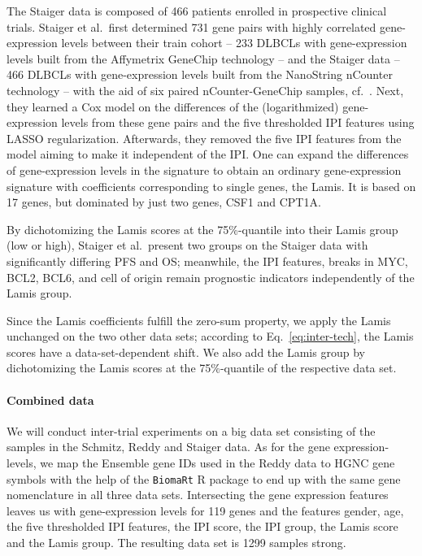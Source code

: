 The Staiger data is composed of \num{466} patients enrolled in prospective clinical trials. 
Staiger et al.\ first determined \num{731} gene pairs with highly correlated gene-expression levels 
between their train cohort -- \num{233} DLBCLs with gene-expression levels built from the Affymetrix 
GeneChip technology -- and the Staiger data -- \num{466} DLBCLs with gene-expression levels built 
from the NanoString nCounter technology -- with the aid of six paired nCounter-GeneChip samples, cf.\ 
\cite[Supplementary Methods]{staiger20}.
Next, they learned a Cox model on the differences of the (logarithmized) gene-expression levels 
from these gene pairs and the five thresholded IPI features using LASSO regularization. 
Afterwards, they removed the five IPI features from the model aiming to make it independent of the 
IPI. One can expand the differences of gene-expression levels in the signature to obtain an ordinary 
gene-expression signature with coefficients corresponding to single genes, the Lamis. It is 
based on \num{17} genes, but dominated by just two genes, CSF1 and CPT1A. 

By dichotomizing the 
Lamis scores at the 75\%-quantile into their Lamis group (low or high), Staiger et al.\ present two 
groups on the Staiger data with significantly differing PFS and OS; 
meanwhile, the IPI features, breaks in MYC, BCL2, BCL6, and cell of origin remain prognostic 
indicators independently of the Lamis group.

Since the Lamis coefficients fulfill the 
zero-sum property, we apply the Lamis unchanged on the two other data sets; according to Eq.\ 
\eqref{eq:inter-tech}, the Lamis scores have a data-set-dependent shift. We also add the Lamis 
group by dichotomizing the Lamis scores at the 75\%-quantile of the respective data set.

\paragraph{Combined data}

We will conduct inter-trial experiments on a big data set consisting of the samples in the Schmitz, 
Reddy and Staiger data. As for the gene expression-levels, we map the Ensemble gene IDs used 
in the Reddy data to HGNC gene symbols with the help of the \texttt{BiomaRt} R package \cite{biomart}
to end up with the same gene nomenclature in all three data sets. Intersecting the gene expression 
features leaves us with gene-expression levels for \num{119} genes and the features gender, age, 
the five thresholded IPI features, the IPI score, the IPI group, the Lamis score and the Lamis 
group. The resulting data set is \num{1299} samples strong.

